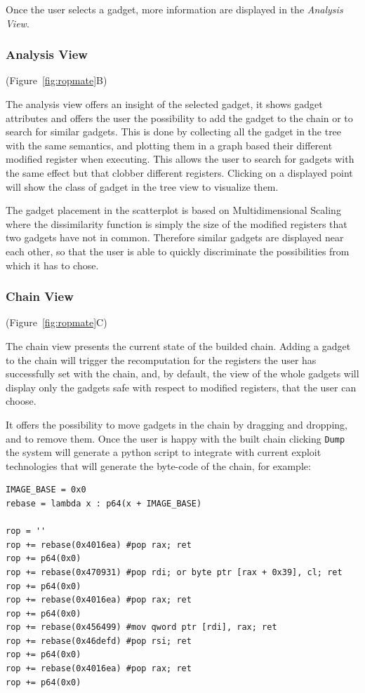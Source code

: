 \documentclass[twocolumn, 11pt]{article}
\begin{document}
Once the user selects a gadget, more information are displayed in the \textit{Analysis View}.

\subsubsection{Analysis View}
(Figure~\ref{fig:ropmate}B)

The analysis view offers an insight of the selected gadget, it shows gadget attributes and offers the user the possibility to add the gadget to the chain or to search for similar gadgets. This is done by collecting all the gadget in the tree with the same semantics, and plotting them in a graph based their different modified register when executing. This allows the user to search for gadgets with the same effect but that clobber different registers. Clicking on a displayed point will show the class of gadget in the tree view to visualize them.

The gadget placement in the scatterplot is based on Multidimensional Scaling where the dissimilarity function is simply the size of the modified registers that two gadgets have not in common. Therefore similar gadgets are displayed near each other, so that the user is able to quickly discriminate the possibilities from which it has to chose.

\subsubsection{Chain View}
(Figure~\ref{fig:ropmate}C)

The chain view presents the current state of the builded chain. Adding a gadget to the chain will trigger the recomputation for the registers the user has successfully set with the chain, and, by default, the view of the whole gadgets will display only the gadgets safe with respect to modified registers, that the user can choose.

It offers the possibility to move gadgets in the chain by dragging and dropping, and to remove them. Once the user is happy with the built chain clicking {\tt Dump} the system will generate a python script to integrate with current exploit technologies that will generate the byte-code of the chain, for example:


\begin{lstlisting}
IMAGE_BASE = 0x0
rebase = lambda x : p64(x + IMAGE_BASE)

rop = ''
rop += rebase(0x4016ea) #pop rax; ret
rop += p64(0x0)
rop += rebase(0x470931) #pop rdi; or byte ptr [rax + 0x39], cl; ret
rop += p64(0x0)
rop += rebase(0x4016ea) #pop rax; ret
rop += p64(0x0)
rop += rebase(0x456499) #mov qword ptr [rdi], rax; ret
rop += rebase(0x46defd) #pop rsi; ret
rop += p64(0x0)
rop += rebase(0x4016ea) #pop rax; ret
rop += p64(0x0)
\end{lstlisting}
\end{document}

